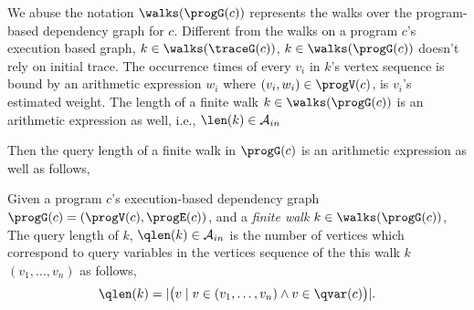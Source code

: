   We abuse the notation $\walks(\progG(c))$ represents the walks over the program-based dependency graph for $c$.
Different from the walks on a program $c$'s execution based graph,
 $k \in \walks(\traceG(c))$, 
$k \in \walks(\progG(c))$ doesn't rely on initial trace.
The occurrence times of every $v_i $ in $k$'s vertex sequence is bound by 
an arithmetic expression $w_i$ where $(v_i, w_i) \in \progV(c)$, is $v_i$'s estimated weight. 
 The length of a finite walk $k \in \walks(\progG(c))$ is an arithmetic expression
 as well, i.e., $\len(k) \in \mathcal{A}_{in}$

 Then the query length of a finite walk in  $\progG(c)$ is an arithmetic expression as well as follows,
\begin{defn}
  \label{def:qlen}
  Given 
  a program $c$'s execution-based dependency graph 
  $\progG({c}) = (\progV(c), \progE(c))$, 
   and a \emph{finite walk} $k \in \walks(\progG(c))$,
  The query length of $k$, $\qlen(k) \in \mathcal{A}_{in}$ 
  is the number of vertices which correspond to query variables in the vertices sequence of the this walk $k$
  $(v_1, \ldots, v_{n})$ as follows, 
  \[
    \qlen(k) = |\big( v \mid v \in (v_1, \ldots, v_{n}) \land v \in \qvar(c) \big)|.
  \]
  \end{defn}
